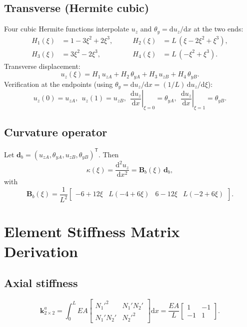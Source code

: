 \documentclass[11pt,a4paper]{article}
\newcommand{\dd}{\mathrm{d}}
\newcommand{\bmath}[1]{\boldsymbol{#1}}
\begin{document}
\subsection{Transverse (Hermite cubic)}

Four cubic Hermite functions interpolate $u_z$ and $\theta_y = \dd u_z/\dd x$ at the two ends:
\[
\begin{aligned}
H_1(\xi) &= 1 - 3\xi^2 + 2\xi^3, &\qquad H_2(\xi) &= L\,(\xi - 2\xi^2 + \xi^3), \\
H_3(\xi) &= 3\xi^2 - 2\xi^3,     &\qquad H_4(\xi) &= L\,(-\xi^2 + \xi^3).
\end{aligned}
\]
Transverse displacement:
\[
u_z(\xi) = H_1\,u_{zA} + H_2\,\theta_{yA} + H_3\,u_{zB} + H_4\,\theta_{yB}.
\]
Verification at the endpoints (using $\theta_y = \dd u_z/\dd x = (1/L)\,\dd u_z/\dd \xi$):
\[
u_z(0) = u_{zA},\ \ u_z(1) = u_{zB},\ \ \left.\frac{\dd u_z}{\dd x}\right|_{\xi=0} = \theta_{yA},\ \ \left.\frac{\dd u_z}{\dd x}\right|_{\xi=1} = \theta_{yB}.
\]

\subsection{Curvature operator}

Let $\bmath{d}_b = (u_{zA}, \theta_{yA}, u_{zB}, \theta_{yB})^\mathsf{T}$. Then
\[
\kappa(\xi) = \frac{\dd^2 u_z}{\dd x^2} = \bmath{B}_b(\xi)\,\bmath{d}_b,
\]
with
\[
\bmath{B}_b(\xi) = \frac{1}{L^2}\begin{bmatrix} -6 + 12\xi & L(-4 + 6\xi) & 6 - 12\xi & L(-2 + 6\xi) \end{bmatrix}.
\]

\section{Element Stiffness Matrix Derivation}\label{sec:stiffness}

\subsection{Axial stiffness}

\[
\bmath{k}^a_{2\times 2} = \int_0^L EA \begin{bmatrix} N_1'^2 & N_1' N_2' \\ N_1' N_2' & N_2'^2 \end{bmatrix} \dd x
= \frac{EA}{L}\begin{bmatrix} 1 & -1 \\ -1 & 1 \end{bmatrix}.
\]
\end{document}
